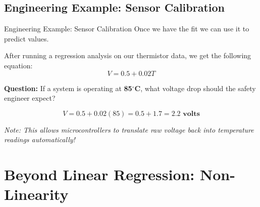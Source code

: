 \subsection{Engineering Example: Sensor Calibration}
\begin{frame}{Engineering Example: Sensor Calibration}
    Once we have the fit we can use it to predict values. 
    \begin{example}
        After running a regression analysis on our thermistor data, we get the following equation:
        \[ V = 0.5 + 0.02 T \]
        
        \textbf{Question:} If a system is operating at \textbf{85$^\circ$C}, what voltage drop should the safety engineer expect?
    \end{example}

\end{frame}
    
    
    \begin{frame}
    \begin{solution}
    \[ V = 0.5 + 0.02(85) = 0.5 + 1.7 = \mathbf{2.2 \text{ volts}} \]
    
    \end{solution}
    
    \textit{Note: This allows microcontrollers to translate raw voltage back into temperature readings automatically!}
\end{frame}

\section{Beyond Linear Regression: Non-Linearity}
